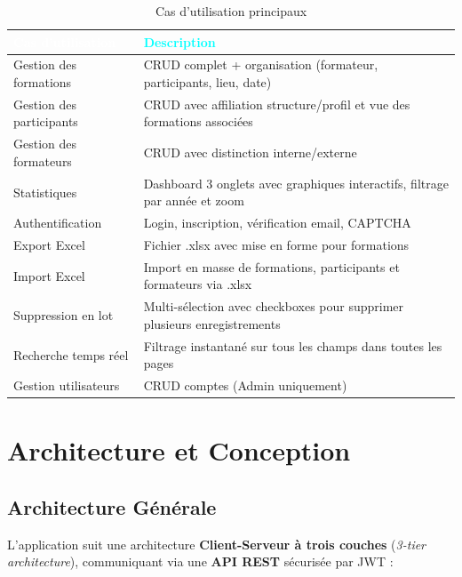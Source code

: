 \documentclass[12pt,a4paper]{report}
\begin{document}
\begin{table}[H]
\centering
\caption{Cas d'utilisation principaux}
\begin{tabularx}{\textwidth}{|L{3.5cm}|X|}
\hline
{} \textcolor{white}{\textbf{Cas d'utilisation}} & \textcolor{cyan}{\textbf{Description}} \\
\hline
Gestion des formations & CRUD complet + organisation (formateur, participants, lieu, date) \\
\hline
Gestion des participants & CRUD avec affiliation structure/profil et vue des formations associ\'{e}es \\
\hline
Gestion des formateurs & CRUD avec distinction interne/externe \\
\hline
Statistiques & Dashboard 3 onglets avec graphiques interactifs, filtrage par ann\'{e}e et zoom \\
\hline
Authentification & Login, inscription, v\'{e}rification email, CAPTCHA \\
\hline
Export Excel & Fichier .xlsx avec mise en forme pour formations \\
\hline
Import Excel & Import en masse de formations, participants et formateurs via .xlsx \\
\hline
Suppression en lot & Multi-s\'{e}lection avec checkboxes pour supprimer plusieurs enregistrements \\
\hline
Recherche temps r\'{e}el & Filtrage instantan\'{e} sur tous les champs dans toutes les pages \\
\hline
Gestion utilisateurs & CRUD comptes (Admin uniquement) \\
\hline
\end{tabularx}
\end{table}

\clearpage

\chapter{Architecture et Conception}

\section{Architecture G\'{e}n\'{e}rale}

L'application suit une architecture \textbf{Client-Serveur \`{a} trois couches} (\textit{3-tier archi\-tecture}), communiquant via une \textbf{API REST} s\'{e}curis\'{e}e par JWT :
\end{document}
